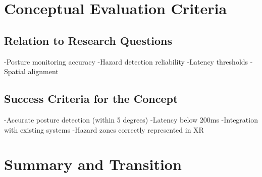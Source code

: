 \section{Conceptual Evaluation Criteria}
\subsection{Relation to Research Questions}
-Posture monitoring accuracy
-Hazard detection reliability
-Latency thresholds
-Spatial alignment 

\subsection{Success Criteria for the Concept}
-Accurate posture detection (within 5 degrees)
-Latency below 200ms
-Integration with existing systems
-Hazard zones correctly represented in XR

\section{Summary and Transition}
